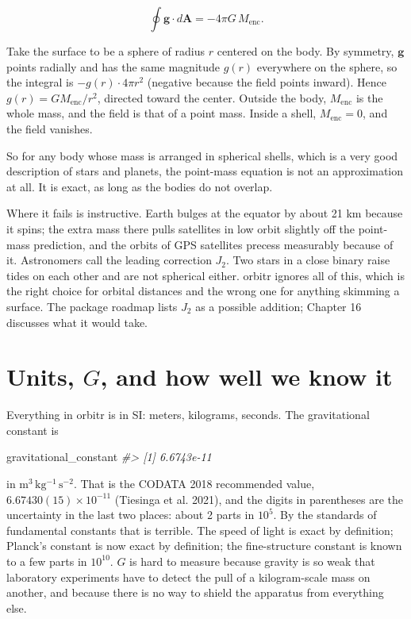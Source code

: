 \documentclass[
  10.5pt,
  letterpaper,
]{scrbook}
\newenvironment{Shaded}{\begin{snugshade}}{\end{snugshade}}
\newcommand{\CommentTok}[1]{\textcolor[rgb]{0.00,0.00,0.00}{\textit{#1}}}
\newcommand{\NormalTok}[1]{\textcolor[rgb]{0.00,0.00,0.00}{#1}}
\theoremstyle{definition}
\theoremstyle{plain}
\theoremstyle{remark}
\begin{document}
\[
\oint \mathbf{g}\cdot d\mathbf{A} = -4\pi G\,M_{\mathrm{enc}}.
\]

Take the surface to be a sphere of radius \(r\) centered on the body. By
symmetry, \(\mathbf{g}\) points radially and has the same magnitude
\(g(r)\) everywhere on the sphere, so the integral is
\(-g(r)\cdot 4\pi r^2\) (negative because the field points inward).
Hence \(g(r) = G M_{\mathrm{enc}}/r^2\), directed toward the center.
Outside the body, \(M_{\mathrm{enc}}\) is the whole mass, and the field
is that of a point mass. Inside a shell, \(M_{\mathrm{enc}} = 0\), and
the field vanishes.

So for any body whose mass is arranged in spherical shells, which is a
very good description of stars and planets, the point-mass equation is
not an approximation at all. It is exact, as long as the bodies do not
overlap.

Where it fails is instructive. Earth bulges at the equator by about 21
km because it spins; the extra mass there pulls satellites in low orbit
slightly off the point-mass prediction, and the orbits of GPS satellites
precess measurably because of it. Astronomers call the leading
correction \(J_2\). Two stars in a close binary raise tides on each
other and are not spherical either. orbitr ignores all of this, which is
the right choice for orbital distances and the wrong one for anything
skimming a surface. The package roadmap lists \(J_2\) as a possible
addition; Chapter 16 discusses what it would take.

\section{\texorpdfstring{Units, \(G\), and how well we know
it}{Units, G, and how well we know it}}\label{units-g-and-how-well-we-know-it}

Everything in orbitr is in SI: meters, kilograms, seconds. The
gravitational constant is

\begin{Shaded}
\begin{Highlighting}[]
\NormalTok{gravitational\_constant}
\CommentTok{\#\textgreater{} [1] 6.6743e{-}11}
\end{Highlighting}
\end{Shaded}

in \(\mathrm{m^3\,kg^{-1}\,s^{-2}}\). That is the CODATA 2018
recommended value, \(6.67430(15)\times10^{-11}\) (Tiesinga et al. 2021),
and the digits in parentheses are the uncertainty in the last two
places: about 2 parts in \(10^5\). By the standards of fundamental
constants that is terrible. The speed of light is exact by definition;
Planck's constant is now exact by definition; the fine-structure
constant is known to a few parts in \(10^{10}\). \(G\) is hard to
measure because gravity is so weak that laboratory experiments have to
detect the pull of a kilogram-scale mass on another, and because there
is no way to shield the apparatus from everything else.
\end{document}
